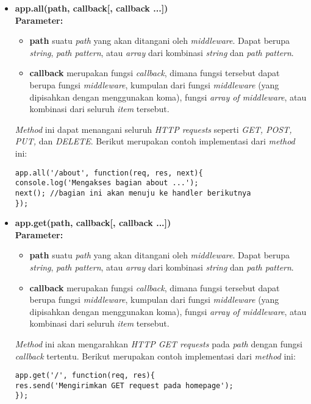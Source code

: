\begin{itemize}
	\item \textbf{app.all(path, callback[, callback ...])} \\ \textbf{Parameter:} 
	\begin{itemize}
		\item \textbf{path} suatu \textit{path} yang akan ditangani oleh \textit{middleware}. Dapat berupa \textit{string}, \textit{path pattern}, atau \textit{array} dari kombinasi \textit{string} dan \textit{path pattern}.
		
		\item \textbf{callback} merupakan fungsi \textit{callback}, dimana fungsi tersebut dapat berupa fungsi \textit{middleware}, kumpulan dari fungsi \textit{middleware} (yang dipisahkan dengan menggunakan koma), fungsi \textit{array of middleware}, atau kombinasi dari seluruh \textit{item} tersebut.
	\end{itemize}
	
	\textit{Method} ini dapat menangani seluruh \textit{HTTP requests} seperti \textit{GET, POST, PUT,} dan \textit{DELETE}. Berikut merupakan contoh implementasi dari \textit{method} ini:
\begin{lstlisting}
app.all('/about', function(req, res, next){
console.log('Mengakses bagian about ...');
next(); //bagian ini akan menuju ke handler berikutnya
});
\end{lstlisting}
	
	\item \textbf{app.get(path, callback[, callback ...])} \\ \textbf{Parameter:}
	\begin{itemize}
		\item \textbf{path} suatu \textit{path} yang akan ditangani oleh \textit{middleware}. Dapat berupa \textit{string}, \textit{path pattern}, atau \textit{array} dari kombinasi \textit{string} dan \textit{path pattern}.
		
		\item \textbf{callback} merupakan fungsi \textit{callback}, dimana fungsi tersebut dapat berupa fungsi \textit{middleware}, kumpulan dari fungsi \textit{middleware} (yang dipisahkan dengan menggunakan koma), fungsi \textit{array of middleware}, atau kombinasi dari seluruh \textit{item} tersebut.
	\end{itemize}
	
	\textit{Method} ini akan mengarahkan \textit{HTTP GET requests} pada \textit{path} dengan fungsi \textit{callback} tertentu. Berikut merupakan contoh implementasi dari \textit{method} ini:
\begin{lstlisting}
app.get('/', function(req, res){
res.send('Mengirimkan GET request pada homepage');
});
	\end{lstlisting}
	

\end{itemize}
